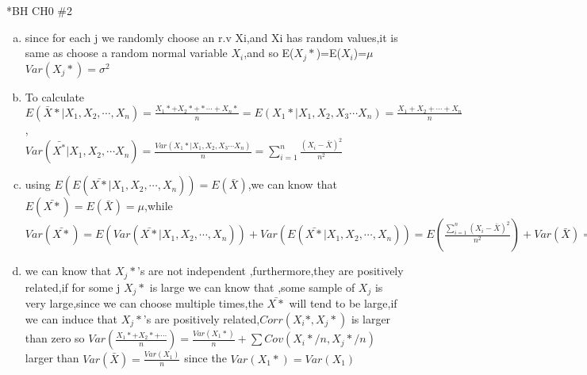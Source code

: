 \documentclass{article}
\begin{document}
\begin{homeworkProblem}*{BH CH0 \#2}
	\begin{enumerate}[(a)]
\item since for each  j we randomly choose an  r.v Xi,and Xi has random values,it is same as choose a random normal variable $X_i$,and so E($X_j*$)=E($X_i$)=$\mu$ $Var(X_j*)=\sigma^{2}$
\item To calculate $E(\bar{X}*|X_1,X_2,\cdots,X_n)=\frac{X_1*+X_2*+*\cdots +X_n*}{n}=E(X_1*|X_1,X_2,X_3\cdots X_n)=\frac{X_1+X_2+\cdots +X_n}{n}$,\\
$Var(\bar{X^*}|X_1,X_2,\cdots X_n)=\frac{Var(X_1*|X_1,X_2,X_3\cdots X_n)}{n}=\sum_{i=1}^{n}\frac{(X_i-\bar{X})^2}{n^2}$
\item using $E(E(\bar{X*}|X_1,X_2,\cdots,X_n))=E(\bar{X})$,we can know that $E(\bar{X*})=E(\bar{X})=\mu$,while $Var(\bar{X*})=E(Var(\bar{X*}|X_1,X_2,\cdots,X_n))+Var(E(\bar{X*}|X_1,X_2,\cdots,X_n))=E(\frac{\sum_{i=1}^{n}(X_i-\bar{X})^{2}}{n^{2}})+Var(\bar{X})=\frac{(n-1)\sigma^{2}}{n^2}+\frac{\sigma^{2}}{n}=\frac{(2n-1)\sigma^{2}}{n^{2}}$
\item we can know that $X_j*$'s are not independent ,furthermore,they are positively related,if for some j $X_j*$ is large we can know that ,some sample of $X_j$ is very large,since we can choose multiple times,the $\bar{X*}$ will tend to be large,if we can induce that $X_j*$'s are positively related,$Corr(X_i*,X_j*)$ is larger than zero so $Var(\frac{X_1*+X_2*+\cdots}{n})=\frac{Var(X_1*)}{n}+\sum Cov(X_i*/n,X_j*/n)$ larger than $Var(\bar{X})=\frac{Var(X_1)}{n}$  since the $Var(X_1*)=Var(X_1)$ 
\end{enumerate}

\end{homeworkProblem}
\end{document}
